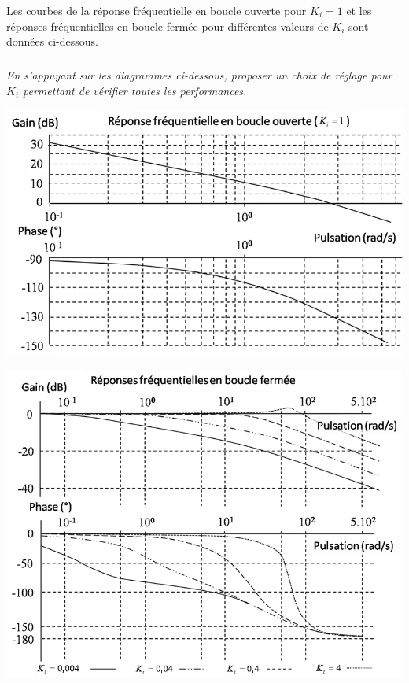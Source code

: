 \documentclass[10pt,fleqn]{article} %
\begin{document}
\begin{multicols}{2}
\ifprof
\else
Les courbes de la réponse fréquentielle en boucle ouverte pour
$K_i=1$ et les réponses fréquentielles en boucle fermée pour différentes valeurs de $K_i$ sont données ci-dessous.
\fi

\subparagraph{}
\textit{En s'appuyant sur les diagrammes ci-dessous, proposer un choix de réglage pour $K_i$ permettant de vérifier toutes les performances.}
\ifprof
\begin{corrige}
\end{corrige}
\else
\fi



\ifprof
\else

\begin{center}
\includegraphics[width=\linewidth]{images/bo}
\end{center}

\begin{center}
\includegraphics[width=\linewidth]{images/bf}
\end{center}


\end{multicols}
\end{document}
